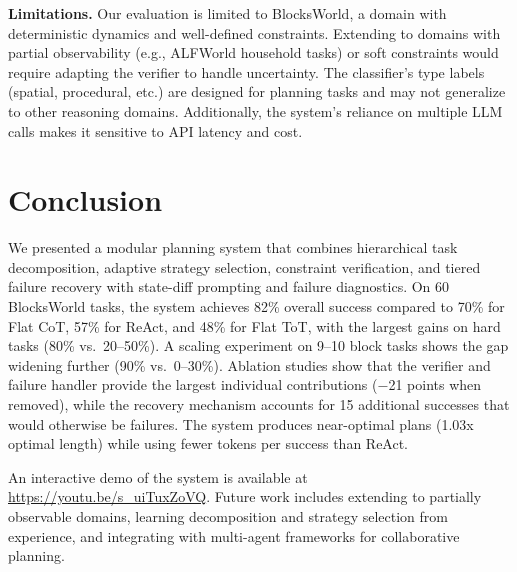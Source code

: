 \documentclass{article}
\begin{document}
\textbf{Limitations.} Our evaluation is limited to BlocksWorld, a domain with deterministic dynamics and well-defined constraints. Extending to domains with partial observability (e.g., ALFWorld household tasks) or soft constraints would require adapting the verifier to handle uncertainty. The classifier's type labels (spatial, procedural, etc.) are designed for planning tasks and may not generalize to other reasoning domains. Additionally, the system's reliance on multiple LLM calls makes it sensitive to API latency and cost.

\section{Conclusion}

We presented a modular planning system that combines hierarchical task decomposition, adaptive strategy selection, constraint verification, and tiered failure recovery with state-diff prompting and failure diagnostics. On 60 BlocksWorld tasks, the system achieves 82\% overall success compared to 70\% for Flat CoT, 57\% for ReAct, and 48\% for Flat ToT, with the largest gains on hard tasks (80\% vs.\ 20--50\%). A scaling experiment on 9--10 block tasks shows the gap widening further (90\% vs.\ 0--30\%). Ablation studies show that the verifier and failure handler provide the largest individual contributions ($-$21 points when removed), while the recovery mechanism accounts for 15 additional successes that would otherwise be failures. The system produces near-optimal plans (1.03x optimal length) while using fewer tokens per success than ReAct.

An interactive demo of the system is available at \url{https://youtu.be/s_uiTuxZoVQ}. Future work includes extending to partially observable domains, learning decomposition and strategy selection from experience, and integrating with multi-agent frameworks for collaborative planning.
\end{document}
